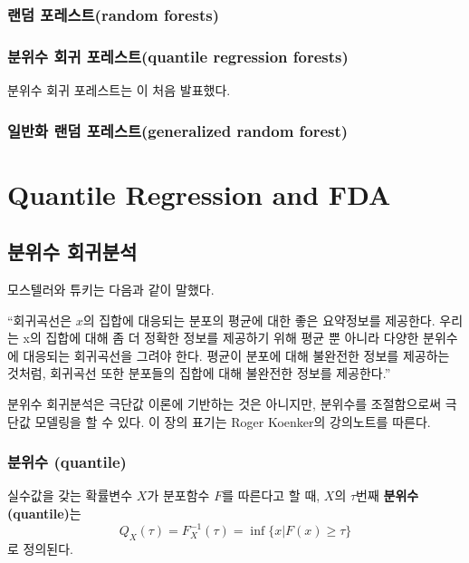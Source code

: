 \documentclass[b5paper,]{scrbook}
\theoremstyle{plain}
\theoremstyle{definition}
\numberwithin{equation}{section}
\let\BeginKnitrBlock\begin \let\EndKnitrBlock\end
\begin{document}
\section{랜덤 포레스트(random forests)}\label{-random-forests}

\section{분위수 회귀 포레스트(quantile regression
forests)}\label{--quantile-regression-forests}

분위수 회귀 포레스트는 \citep{Meinshausen2006}이 처음 발표했다.

\section{일반화 랜덤 포레스트(generalized random
forest)}\label{--generalized-random-forest}

\part{Quantile Regression and
FDA}\label{part-quantile-regression-and-fda}

\chapter{분위수 회귀분석}\label{qr}

모스텔러와 튜키는 다음과 같이 말했다.

``회귀곡선은 \(x\)의 집합에 대응되는 분포의 평균에 대한 좋은 요약정보를
제공한다. 우리는 x의 집합에 대해 좀 더 정확한 정보를 제공하기 위해 평균
뿐 아니라 다양한 분위수에 대응되는 회귀곡선을 그려야 한다. 평균이 분포에
대해 불완전한 정보를 제공하는 것처럼, 회귀곡선 또한 분포들의 집합에 대해
불완전한 정보를 제공한다.''

분위수 회귀분석은 극단값 이론에 기반하는 것은 아니지만, 분위수를
조절함으로써 극단값 모델링을 할 수 있다. 이 장의 표기는 Roger Koenker의
강의노트를 따른다.

\section{분위수 (quantile)}\label{-quantile}

\BeginKnitrBlock{definition}[분위수]
\protect\hypertarget{def:unnamed-chunk-193}{}{\label{def:unnamed-chunk-193}
{} }실수값을 갖는 확률변수 \(X\)가 분포함수 \(F\)를
따른다고 할 때, \(X\)의 \(\tau\)번째 \textbf{분위수(quantile)}는
\[Q_{X}(\tau)=F_{X}^{-1}(\tau)=\inf\{x|F(x)\geq \tau\}\] 로 정의된다.
\EndKnitrBlock{definition}
\end{document}
